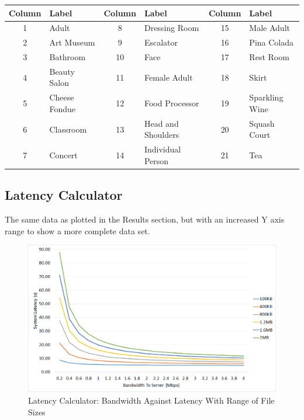 \documentclass{article}
\begin{document}
\begin{landscape}
\begin{table}
\centering
\begin{tabularx}{\textheight}{|c| X |c |X |c |l |}
\hline
Column &  Label & Column & Label & Column & Label\\
\hline
1&Adult& 8 &Dressing Room & 15&Male Adult \\
2&Art Museum & 9 &Escalator & 16 & Pina Colada\\
3&Bathroom &10&Face&17&Rest Room \\
4&Beauty Salon &11&Female Adult &18&Skirt\\
5&Cheese Fondue &12&Food Processor & 19&Sparkling Wine\\
6&Classroom &13&Head and Shoulders & 20&Squash Court\\
7&Concert &14&Individual Person&21&Tea\\
\hline
\end{tabularx}
\end{table}
\end{landscape}

\subsection{Latency Calculator}
The same data as plotted in the Results section, but with an increased Y axis range to show a more complete data set.  
\begin{figure}[h]
\caption{Latency Calculator: Bandwidth Against Latency With Range of File Sizes\label{fig:LatencyVsBandwidthMaxAxis}}
\includegraphics[width=\textwidth]{LatencyVsBandwidthMaxAxis}
\end{figure}
\end{document}
